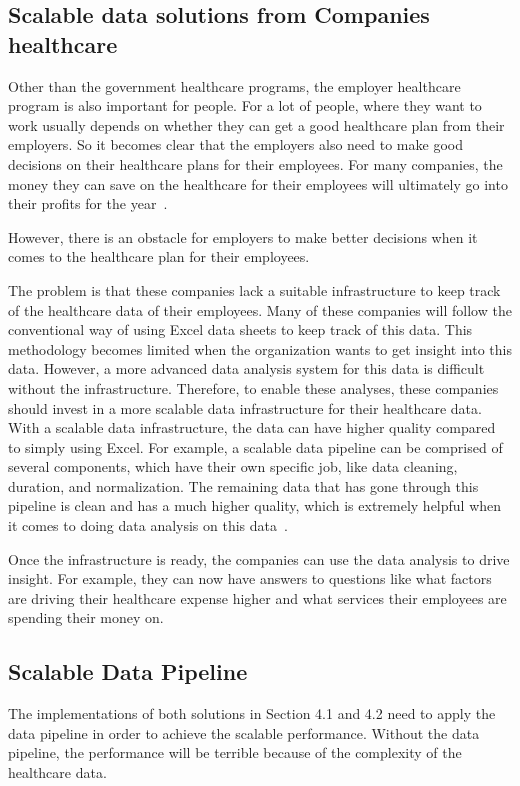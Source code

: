 \subsection{Scalable data solutions from Companies healthcare}
Other than the government healthcare programs, 
the employer healthcare 
program is also important for people. 
For a lot of people, where they want 
to work usually depends on whether they can get 
a good healthcare plan from 
their employers. So it becomes clear that the 
employers also need to make 
good decisions on their healthcare plans for 
their employees. For many 
companies, the money they can save on the 
healthcare for their employees 
will ultimately go into their profits for the year~\cite{bus}. 

However, there is an obstacle for employers to make better decisions when 
it comes to the healthcare plan for their employees.

The problem is that these companies lack a suitable infrastructure to keep 
track of the healthcare data of their employees. Many of these companies 
will follow the conventional way of using Excel data sheets to keep track of 
this data. This methodology becomes limited when the organization wants 
to get insight into this data. However, a more advanced data 
analysis system for this
data is difficult without the infrastructure. Therefore, to enable these 
analyses, these companies should invest in a more scalable data 
infrastructure for their healthcare data. With a scalable data infrastructure, 
the data can have higher quality compared to simply using Excel. For 
example, a scalable data pipeline can be comprised of several components, 
which have their own specific job, like data cleaning, duration, and 
normalization. The remaining data that has gone through this pipeline is
clean and has a much higher quality, which is extremely helpful 
when it comes to doing data analysis on this data~\cite{bus}.

Once the infrastructure is ready, the companies can use the data analysis 
to drive insight. For example, they can now have answers to questions like 
what factors are driving their healthcare expense higher and what services 
their employees are spending their money on.

\subsection{Scalable Data Pipeline}
The implementations of both solutions in Section 4.1 and 4.2 need to 
apply the data pipeline in order to achieve the scalable performance. 
Without the data pipeline, the performance will be terrible 
because of the complexity of the healthcare data.


